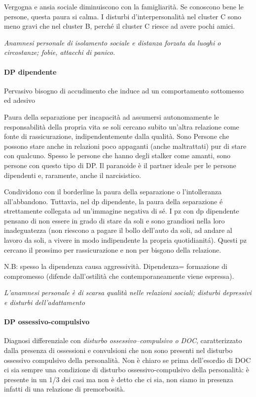 Vergogna e ansia sociale diminuiscono con la famigliarità. Se conoscono
bene le persone, questa paura si calma. I disturbi d'interpersonalità
nel cluster C sono meno gravi che nel cluster B, perché il cluster C
riesce ad avere pochi amici.

\emph{\emph{Anamnesi personale di isolamento sociale e distanza forzata
da luoghi o circostanze; fobie, attacchi di panico. }}

\paragraph{DP dipendente}

Pervasivo bisogno di accudimento che induce ad un comportamento
sottomesso ed adesivo

Paura della separazione per incapacità ad assumersi autonomamente le
responsabilità della propria vita se soli cercano subito un'altra
relazione come fonte di rassicurazione, indipendentemente dalla qualità.
Sono Persone che possono stare anche in relazioni poco appaganti (anche
maltrattati) pur di stare con qualcuno. Spesso le persone che hanno
degli stalker come amanti, sono persone con questo tipo di DP. Il
paranoide è il partner ideale per le persone dipendenti e, raramente,
anche il narcisistico.

Condividono con il borderline la paura della separazione o
l'intolleranza all'abbandono. Tuttavia, nel dp dipendente, la paura
della separazione é strettamente collegata ad un'immagine negativa di
sé. I pz con dp dipendente pensano di non essere in grado di stare da
soli e sono grandiosi nella loro inadeguatezza (non riescono a pagare il
bollo dell'auto da soli, ad andare al lavoro da soli, a vivere in modo
indipendente la propria quotidianitá). Questi pz cercano il prossimo per
rassicurazione e non per bisgono della relazione.

N.B: spesso la dipendenza causa aggressività. Dipendenza= formazione di
compromesso (difende dall'ostilità che contemporaneamente viene
espressa).

\emph{\emph{L'anamnesi personale è di scarsa qualità nelle relazioni
sociali; disturbi depressivi e disturbi dell'adattamento}}

\paragraph{DP ossessivo-compulsivo}

Diagnosi differenziale con \emph{disturbo ossessivo--compulsivo o DOC},
caratterizzato dalla presenza di ossessioni e convulsioni che non sono
presenti nel disturbo ossessivo compulsivo della personalità. Non è
chiaro se prima dell'esordio di DOC ci sia sempre una condizione di
disturbo ossessivo-compulsivo della personalità: è presente in un 1/3
dei casi ma non è detto che ci sia, non siamo in presenza infatti di una
relazione di premorbosità.

